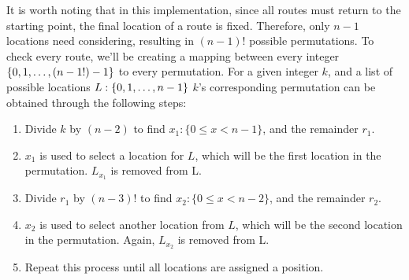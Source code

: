\noindent
It is worth noting that in this implementation, since all routes must return to the starting point, the final location
of a route is fixed.
Therefore, only $n-1$ locations need considering, resulting in $(n-1)!$ possible permutations.
To check every route, we'll be creating a mapping between every integer $\{0, 1, \mathellipsis, (n-1!)-1\}$ to every
permutation.
For a given integer $k$, and a list of possible locations $L: \{0, 1, \mathellipsis, n-1\}$ $k$'s corresponding
permutation can be obtained through the following steps:
\begin{enumerate}
    \item Divide $k$ by $(n-2)$ to find $x_1: \{0\leq x<n-1\}$, and the remainder $r_1$.
    \item $x_1$ is used to select a location for $L$, which will be the first location in the permutation. $L_{x_1}$ is
    removed from L.
    \item Divide $r_1$ by $(n-3)!$ to find $x_2: \{0\leq x<n-2\}$, and the remainder $r_2$.
    \item $x_2$ is used to select another location from $L$, which will be the second location in the permutation.
    Again, $L_{x_2}$ is removed from L.
    \item Repeat this process until all locations are assigned a position.
\end{enumerate}

